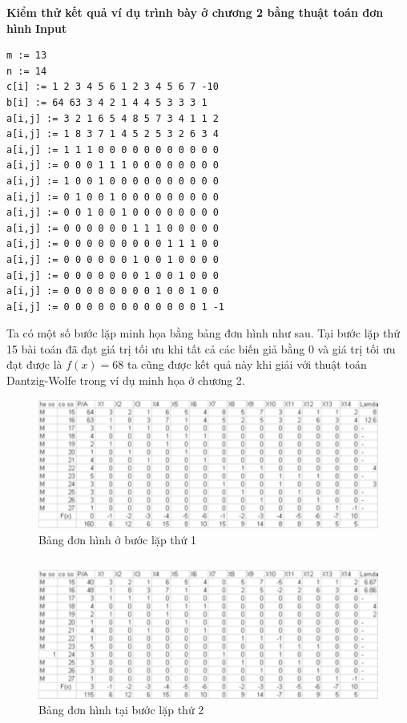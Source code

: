 \textbf{Kiểm thử kết quả ví dụ trình bày ở chương 2 bằng thuật toán đơn hình}
\textbf{Input}
\begin{verbatim}
m := 13
n := 14
c[i] := 1 2 3 4 5 6 1 2 3 4 5 6 7 -10
b[i] := 64 63 3 4 2 1 4 4 5 3 3 3 1
a[i,j] := 3 2 1 6 5 4 8 5 7 3 4 1 1 2
a[i,j] := 1 8 3 7 1 4 5 2 5 3 2 6 3 4
a[i,j] := 1 1 1 0 0 0 0 0 0 0 0 0 0 0
a[i,j] := 0 0 0 1 1 1 0 0 0 0 0 0 0 0
a[i,j] := 1 0 0 1 0 0 0 0 0 0 0 0 0 0
a[i,j] := 0 1 0 0 1 0 0 0 0 0 0 0 0 0
a[i,j] := 0 0 1 0 0 1 0 0 0 0 0 0 0 0
a[i,j] := 0 0 0 0 0 0 1 1 1 0 0 0 0 0
a[i,j] := 0 0 0 0 0 0 0 0 0 1 1 1 0 0
a[i,j] := 0 0 0 0 0 0 1 0 0 1 0 0 0 0
a[i,j] := 0 0 0 0 0 0 0 1 0 0 1 0 0 0
a[i,j] := 0 0 0 0 0 0 0 0 1 0 0 1 0 0
a[i,j] := 0 0 0 0 0 0 0 0 0 0 0 0 1 -1
\end{verbatim}
Ta có một số bước lặp minh họa bằng bảng đơn hình như sau. Tại bước lặp thứ 15 bài toán đã đạt giá trị tối ưu khi tất cả các biến giả bằng 0 và giá trị tối ưu đạt được là $f(x)=68$ ta cũng được kết quả này khi giải với thuật toán Dantzig-Wolfe trong ví dụ minh họa ở chương 2.
\begin{figure}[!ht]
\begin{center}
\includegraphics{lap1.pdf}
\caption{Bảng đơn hình ở bước lặp thứ 1}
\end{center}
\end{figure}
\begin{verbatim}

\end{verbatim}
\begin{figure}[!ht]
\begin{center}
\includegraphics{lap2.pdf}
\caption{Bảng đơn hình tại bước lặp thứ 2}
\end{center}
\end{figure}
